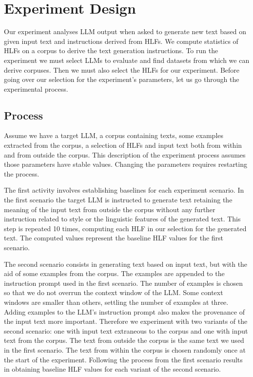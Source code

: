 \documentclass[11pt]{article}
\begin{document}
\section{Experiment Design}\label{method}

Our experiment analyses LLM output when asked to generate new text based on
given input text and instructions derived from HLFs.
We compute statistics of HLFs on a corpus to derive the text generation
instructions.
To run the experiment we must select LLMs to evaluate and find datasets from
which we can derive corpuses.
Then we must also select the HLFs for our experiment.
Before going over our selection for the experiment's parameters, let us go
through the experimental process.

\subsection{Process}\label{subsec:experiment-process}

Assume we have a target LLM, a corpus containing texts, some examples extracted
from the corpus, a selection of HLFs and input text both from within and from
outside the corpus.
This description of the experiment process assumes those parameters have stable
values.
Changing the parameters requires restarting the process.

The first activity involves establishing baselines for each experiment scenario.
In the first scenario the target LLM is instructed to generate text retaining
the meaning of the input text from outside the corpus without any further
instruction related to style or the linguistic features of the generated text.
This step is repeated 10 times, computing each HLF in our selection for the
generated text.
The computed values represent the baseline HLF values for the first scenario.

The second scenario consists in generating text based on input text, but with
the aid of some examples from the corpus.
The examples are appended to the instruction prompt used in the first scenario.
The number of examples is chosen so that we do not overrun the context window of
the LLM.\@
Some context windows are smaller than others, settling the number of examples at
three.
Adding examples to the LLM's instruction prompt also makes the provenance of the
input text more important.
Therefore we experiment with two variants of the second scenario: one with input
text extraneous to the corpus and one with input text from the corpus.
The text from outside the corpus is the same text we used in the first scenario.
The text from within the corpus is chosen randomly once at the start of the
experiment.
Following the process from the first scenario results in obtaining baseline HLF
values for each variant of the second scenario.
\end{document}
